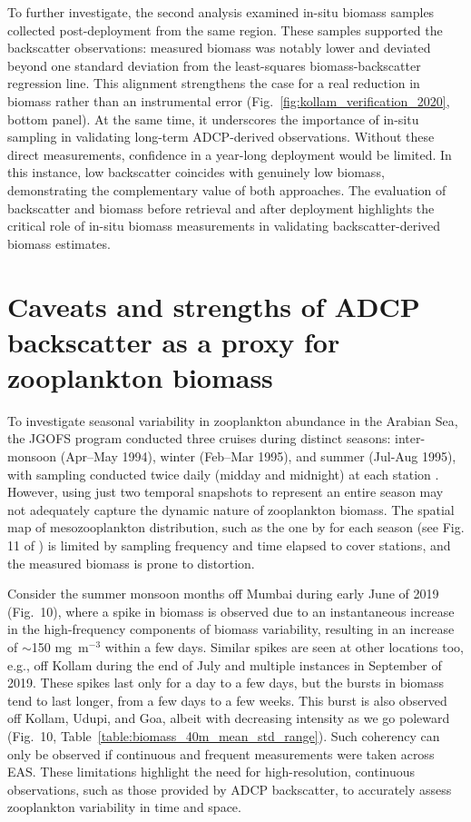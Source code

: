 \documentclass[12pt,a4paper]{article}
\begin{document}
To further investigate, the second analysis examined in-situ biomass samples collected post-deployment from the same region. These samples supported the backscatter observations: measured biomass was notably lower and deviated beyond one standard deviation from the least-squares biomass-backscatter regression line. This alignment strengthens the case for a real reduction in biomass rather than an instrumental error (Fig.~\ref{fig:kollam_verification_2020}, bottom panel). At the same time, it underscores the importance of in-situ sampling in validating long-term ADCP-derived observations. Without these direct measurements, confidence in a year-long deployment would be limited. In this instance, low backscatter coincides with genuinely low biomass, demonstrating the complementary value of both approaches. The evaluation of backscatter and biomass before retrieval and after deployment highlights the critical role of in-situ biomass measurements in validating backscatter-derived biomass estimates.


\section{Caveats and strengths of ADCP backscatter as a proxy for zooplankton biomass}
\label{sec:discuss.caveats.intraseasonal}

To investigate seasonal variability in zooplankton abundance in the Arabian Sea, the JGOFS program conducted three cruises during distinct seasons: inter-monsoon (Apr--May 1994), winter (Feb--Mar 1995), and summer (Jul-Aug 1995), with sampling conducted twice daily (midday and midnight) at each station \citep{madhupratap1996lack}. However, using just two temporal snapshots to represent an entire season may not adequately capture the dynamic nature of zooplankton biomass. The spatial map of mesozooplankton distribution, such as the one by \citet{jyothibabu2010re} for each season (see Fig. 11 of \cite{jyothibabu2010re}) is limited by sampling frequency and time elapsed to cover stations, and the measured biomass is prone to distortion.

Consider the summer monsoon months off Mumbai during early June of 2019 (Fig.~10), where a spike in biomass is observed due to an instantaneous increase in the high-frequency components of biomass variability, resulting in an increase of $\sim$150 mg~m$^{-3}$ within a few days. Similar spikes are seen at other locations too, e.g., off Kollam during the end of July and multiple instances in September of 2019. These spikes last only for a day to a few days, but the bursts in biomass tend to last longer, from a few days to a few weeks. This burst is also observed off Kollam, Udupi, and Goa, albeit with decreasing intensity as we go poleward (Fig.~10, Table~\ref{table:biomass_40m_mean_std_range}). Such coherency can only be observed if continuous and frequent measurements were taken across EAS. These limitations highlight the need for high-resolution, continuous observations, such as those provided by ADCP backscatter, to accurately assess zooplankton variability in time and space.
\end{document}
